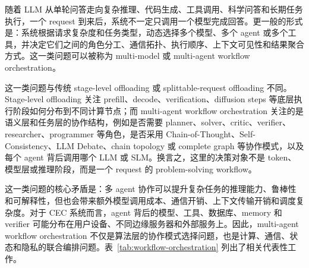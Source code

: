 随着 LLM 从单轮问答走向复杂推理、代码生成、工具调用、科学问答和长期任务执行，一个 request 到来后，系统不一定只调用一个模型完成回答。更一般的形式是：系统根据请求复杂度和任务类型，动态选择多个模型、多个 agent 或多个工具，并决定它们之间的角色分工、通信拓扑、执行顺序、上下文可见性和结果聚合方式。这一类问题可以被称为 multi-model 或 multi-agent workflow orchestration。


这一类问题与传统 stage-level offloading 或 splittable-request offloading 不同。Stage-level offloading 关注 prefill、decode、verification、diffusion steps 等底层执行阶段如何分布到不同计算节点；而 multi-agent workflow orchestration 关注的是语义层和任务层的协作结构，例如是否需要 planner、solver、critic、verifier、researcher、programmer 等角色，是否采用 Chain-of-Thought、Self-Consistency、LLM Debate、chain topology 或 complete graph 等协作模式，以及每个 agent 背后调用哪个 LLM 或 SLM。换言之，这里的决策对象不是 token、模型层或推理阶段，而是一个 request 的 problem-solving workflow。


这一类问题的核心矛盾是：多 agent 协作可以提升复杂任务的推理能力、鲁棒性和可解释性，但也会带来额外模型调用成本、通信开销、上下文传输开销和调度复杂度。对于 CEC 系统而言，agent 背后的模型、工具、数据库、memory 和 verifier 可能分布在用户设备、不同边缘服务器和外部服务上。因此，multi-agent workflow orchestration 不仅是算法层的协作模式选择问题，也是计算、通信、状态和隐私的联合编排问题。表~\ref{tab:workflow-orchestration} 列出了相关代表性工作。


